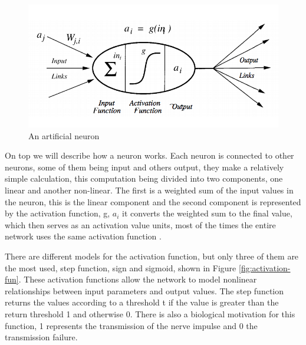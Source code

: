  \begin{figure}[htbp]
	\centerline{\includegraphics[scale=0.75]{fig/un-neuron.png}}  
  \caption{An artificial neuron  \cite{book.neuronal.network.1995}}
  \label{fig:anneuron}
  
\end{figure}

On top we will describe how a neuron works. Each neuron is connected to other neurons, 
some of them being input and others output, they make a relatively simple calculation, 
this computation being divided into two components, one linear and another non-linear. 
The first is a weighted sum of the input values in the neuron, this is the linear component and the 
second component is represented by the activation function, g, $a_i$
it converts the weighted sum to the final value, which then serves as an activation value units,
 most of the times the entire network uses the same activation function \cite{book.neuronal.network.1995}. 


 There are different models for the activation function, but only three of them are the most used, step function,
  sign and sigmoid, shown in Figure \ref{fig:activation-fun}. These activation functions allow the network to model nonlinear relationships between input parameters and output values. The step function returns the values according to a threshold t if the value is greater than the return threshold 1 and otherwise 0. There is also a biological motivation for this function, 1 represents the transmission of the nerve impulse and 0 the transmission failure.


